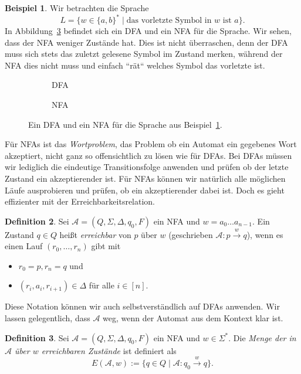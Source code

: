 \documentclass[11pt, a4paper]{article}
\theoremstyle{definition}
\newtheorem{definition}{Definition}[section]
\newtheorem{example}[definition]{Beispiel}
\theoremstyle{plain}
\numberwithin{equation}{section}
\newcommand{\reaches}[1]{\overset{#1}{\rightarrow}}
\begin{document}
\begin{example}\label{exp:ex2}
	Wir betrachten die Sprache
	\[
		L = \{ w \in \{a, b\}^\ast \mid \text{das vorletzte Symbol in } w \text{ ist } a \}.
	\]
	In Abbildung~\ref{fig:nfa_ex1} befindet sich ein DFA und ein NFA für die Sprache. Wir sehen, dass der NFA weniger Zustände hat. Dies ist nicht überraschen, denn der DFA muss sich stets das zuletzt gelesene Symbol im Zustand merken, während der NFA dies nicht muss und einfach ``rät`` welches Symbol das vorletzte ist.
\end{example}
\begin{figure}
	\centering
	\begin{subfigure}[b]{.49\textwidth}
		\centering
		
		\caption{DFA}
		\label{fig:nfa_ex1dfa}
	\end{subfigure}
	\begin{subfigure}[b]{.49\textwidth}
		\centering
		
		\caption{NFA}
		\label{fig:nfa_ex1nfa}
	\end{subfigure}
	\caption{Ein DFA und ein NFA für die Sprache aus Beispiel~\ref{exp:ex2}.}
	\label{fig:nfa_ex1}
\end{figure}
Für NFAs ist das \textit{Wortproblem}, das Problem ob ein Automat ein gegebenes Wort akzeptiert, nicht ganz so offensichtlich zu lösen wie für DFAs. Bei DFAs müssen wir lediglich die eindeutige Transitionsfolge anwenden und prüfen ob der letzte Zustand ein akzeptierender ist. Für NFAs können wir natürlich alle möglichen Läufe ausprobieren und prüfen, ob ein akzeptierender dabei ist. Doch es gieht effizienter mit der Erreichbarkeitsrelation.
\begin{definition}
	Sei \( \mathcal{A} = (Q, \Sigma, \Delta, q_0, F) \) ein NFA und \( w = a_0 \ldots a_{n-1} \). Ein Zustand \( q \in Q \) heißt \textit{erreichbar} von \( p \) über \( w \) (geschrieben \( \mathcal{A}: p \reaches{w} q \)), wenn es einen Lauf \( (r_0, \ldots, r_n) \) gibt mit 
	\begin{itemize}
		\item \( r_0 = p, r_n = q \) und
		\item \( (r_i, a_i, r_{i+1}) \in \Delta \) für alle \( i \in [n] \).
	\end{itemize}
\end{definition}
Diese Notation können wir auch selbstverständlich auf DFAs anwenden. Wir lassen gelegentlich, dass \( \mathcal{A} \) weg, wenn der Automat aus dem Kontext klar ist.
\begin{definition}
	Sei \( \mathcal{A} = (Q, \Sigma, \Delta, q_0, F) \) ein NFA und \( w \in \Sigma^\ast \). Die \textit{Menge der in \( \mathcal{A} \) über \( w \) erreichbaren Zustände} ist definiert als
	\[
		E(\mathcal{A}, w) := \{ q \in Q \mid \mathcal{A}: q_0 \reaches{w} q \}.
	\]
\end{definition}
\end{document}
